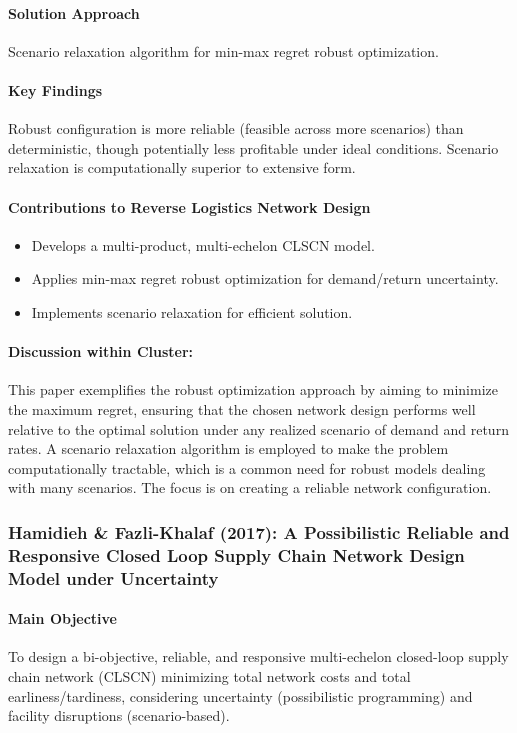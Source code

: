 \paragraph{Solution Approach} Scenario relaxation algorithm for min-max regret robust optimization.
\paragraph{Key Findings} Robust configuration is more reliable (feasible across more scenarios) than deterministic, though potentially less profitable under ideal conditions. Scenario relaxation is computationally superior to extensive form.
\paragraph{Contributions to Reverse Logistics Network Design}
\begin{itemize}
    \item Develops a multi-product, multi-echelon CLSCN model.
    \item Applies min-max regret robust optimization for demand/return uncertainty.
    \item Implements scenario relaxation for efficient solution.
\end{itemize}
\paragraph{Discussion within Cluster:} This paper exemplifies the robust optimization approach by aiming to minimize the maximum regret, ensuring that the chosen network design performs well relative to the optimal solution under any realized scenario of demand and return rates. A scenario relaxation algorithm is employed to make the problem computationally tractable, which is a common need for robust models dealing with many scenarios. The focus is on creating a reliable network configuration.

\subsubsection{Hamidieh \& Fazli-Khalaf (2017): A Possibilistic Reliable and Responsive Closed Loop Supply Chain Network Design Model under Uncertainty}
\paragraph{Main Objective} To design a bi-objective, reliable, and responsive multi-echelon closed-loop supply chain network (CLSCN) minimizing total network costs and total earliness/tardiness, considering uncertainty (possibilistic programming) and facility disruptions (scenario-based).
